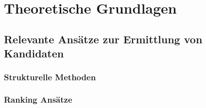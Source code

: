 \chapter{Theoretische Grundlagen}\label{chap_foundation}
\section{Relevante Ansätze zur Ermittlung von Kandidaten}
\cite{Hummel2013}\cite{hummel08}
\subsection{Strukturelle Methoden}
\cite{hummel08}\cite{mil98}\cite{ric78}\cite{pau94}
\subsection{Ranking Ansätze}
\cite{gir94}


